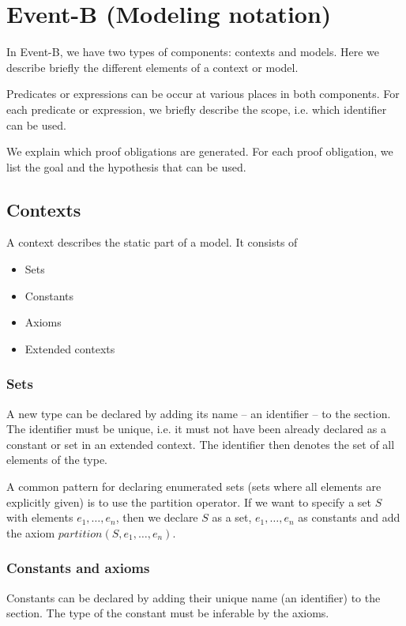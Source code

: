 \section{Event-B (Modeling notation)}
\label{reference_02}

In Event-B, we have two types of components: contexts and models.
Here we describe briefly the different elements of a context or model.

Predicates or expressions can be occur at various places in both components.
For each predicate or expression, we briefly describe the scope, i.e. which
identifier can be used.

We explain which proof obligations are generated. 
For each proof obligation, we list the goal and the hypothesis that can be used.

\subsection{Contexts}
A context describes the static part of a model. It consists of
\begin{itemize}
\item Sets
\item Constants
\item Axioms
\item Extended contexts
\end{itemize}

\subsubsection{Sets}
\label{sets}
A new type can be declared by adding its name -- an identifier -- to the  section.
The identifier must be unique, i.e. it must not have been already declared as a constant or set in an extended context.
The identifier then denotes the set of all elements of the type. 

A common pattern for declaring enumerated sets (sets where all elements are explicitly given)
is to use the partition operator. If we want to specify a set $S$ with elements $e_1,\ldots,e_n$, then
we declare $S$ as a set, $e_1,\ldots,e_n$ as constants and add the axiom $partition(S,e_1,\ldots,e_n)$.

\subsubsection{Constants and axioms}
\label{constants_and_axioms}
Constants can be declared by adding their unique name (an identifier) to the  section.
The type of the constant must be inferable by the axioms.

